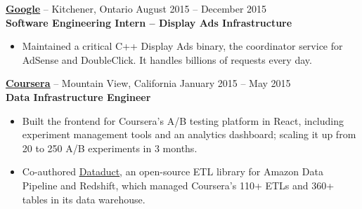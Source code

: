 \documentclass{letter}
\begin{document}
\vspace{-1.5mm}
{\bfseries \href{https://www.google.com}{\uline{Google}}} -- Kitchener, Ontario \hfill August 2015 -- December 2015\\
{\bfseries Software Engineering Intern -- Display Ads Infrastructure}
\vspace{-3mm}
\begin{itemize}
    \item Maintained a critical C++ Display Ads binary, the coordinator service
      for AdSense and DoubleClick. It handles billions of requests every day.
\end{itemize}

\vspace{-1.5mm}
{\bfseries \href{https://www.coursera.org}{\uline{Coursera}}} -- Mountain View, California \hfill January 2015 -- May 2015 \\
{\bfseries Data Infrastructure Engineer}
\vspace{-3mm}
\begin{itemize}
    \item Built the frontend for Coursera's A/B testing platform in React,
      including experiment management tools and an analytics dashboard; scaling
      it up from 20 to 250 A/B experiments in 3 months.
    \item Co-authored \href{https://github.com/coursera/dataduct}{\uline{Dataduct}},
      an open-source ETL library for Amazon Data Pipeline and Redshift, which
      managed Coursera's 110+ ETLs and 360+ tables in its data warehouse.
\end{itemize}

\end{document}
